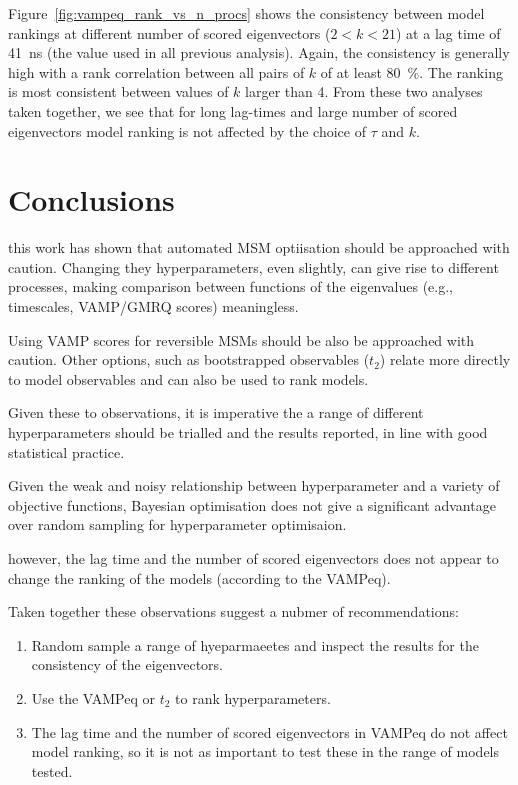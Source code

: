 \documentclass[journal=jacsat,manuscript=article]{achemso}
\begin{document}
Figure~\ref{fig:vampeq_rank_vs_n_procs} shows the consistency between model rankings at different number of scored eigenvectors ($2 < k < 21$) at a lag time of \SI{41}{\nano\second} (the value used in all previous analysis). Again, the consistency is generally high with a rank correlation between all pairs of $k$ of at least \SI{80}{\percent}. The ranking is most consistent between values of $k$ larger than \num{4}.  From these two analyses taken together, we see that for long lag-times and large number of scored eigenvectors model ranking is not affected by the choice of $\tau$ and $k$.

\section{Conclusions}

this work has shown that automated MSM optiisation should be approached with caution.  Changing they hyperparameters, even slightly, can give rise to different processes, making comparison between functions of the eigenvalues (e.g., timescales, VAMP/GMRQ scores) meaningless.  

Using VAMP scores for reversible MSMs should be also be approached with caution.  Other options, such as bootstrapped observables ($t_2$) relate more directly to model observables and can also be used to rank models.  

Given these to observations, it is imperative the a range of different hyperparameters should be trialled and the results reported, in line with good statistical practice.  

Given the weak and noisy relationship between hyperparameter and a variety of objective functions, Bayesian optimisation does not give a significant advantage over random sampling for hyperparameter optimisaion. 

however, the lag time and the number of scored eigenvectors does not appear to change the ranking of the models (according to the VAMPeq).  

Taken together these observations suggest a nubmer of recommendations: 

\begin{enumerate}
    \item Random sample a range of hyeparmaeetes and inspect the results for the consistency of the eigenvectors.  
    \item Use the VAMPeq or $t_2$ to rank hyperparameters. 
    \item The lag time and the number of scored eigenvectors in VAMPeq do not affect model ranking, so it is not as important to test these in the range of models tested. 
\end{enumerate}
\end{document}
